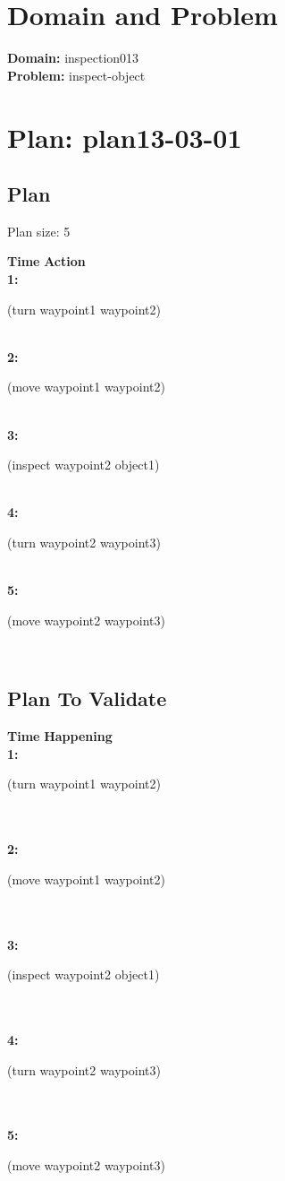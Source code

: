 \documentclass[a4paper,12pt]{article}
\author{\mbox{\sc {\sc Val}}}
\newcommand{\headingtimeaction}{{\bf Time} \qquad \= {\bf Action}\\[0.8ex]}
\newcommand{\headingtimehappening}{{\bf Time} \qquad \= {\bf Happening}\\[0.8ex]}
\newcommand{\atime}[1]{{\bf #1:}}
\newcommand{\action}[1]{{\sf #1}}
\newcommand{\listrow}[1]{\begin{minipage}[t]{11.5cm} #1 \end{minipage}}
\begin{document}
 \maketitle 
\section{Domain and Problem}
{\bf Domain:} inspection013\\
{\bf Problem:} inspect-object
\section{\sloppy Plan: plan13-03-01}
\subsection{Plan}
Plan size: 5
\begin{tabbing}
\headingtimeaction 
\atime{1} \> \listrow{\action{(turn waypoint1 waypoint2)}}\\
\atime{2} \> \listrow{\action{(move waypoint1 waypoint2)}}\\
\atime{3} \> \listrow{\action{(inspect waypoint2 object1)}}\\
\atime{4} \> \listrow{\action{(turn waypoint2 waypoint3)}}\\
\atime{5} \> \listrow{\action{(move waypoint2 waypoint3)}}\\
\end{tabbing}
\subsection{Plan To Validate}
\begin{tabbing}
\headingtimehappening 
\atime{1}  \> \listrow{\action{(turn waypoint1 waypoint2)}}\\
\\\atime{2}  \> \listrow{\action{(move waypoint1 waypoint2)}}\\
\\\atime{3}  \> \listrow{\action{(inspect waypoint2 object1)}}\\
\\\atime{4}  \> \listrow{\action{(turn waypoint2 waypoint3)}}\\
\\\atime{5}  \> \listrow{\action{(move waypoint2 waypoint3)}}\\
\end{tabbing}
\end{document}
